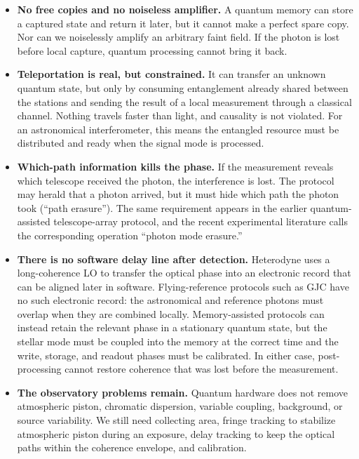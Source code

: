 \documentclass[]{spie}
\begin{document}
\begin{itemize}[leftmargin=*,itemsep=2pt]
    \item \textbf{No free copies and no noiseless amplifier.} A quantum memory can store a captured state and return it later, but it cannot make a perfect spare copy. Nor can we noiselessly amplify an arbitrary faint field. If the photon is lost before local capture, quantum processing cannot bring it back.

    \item \textbf{Teleportation is real, but constrained.} It can transfer an unknown quantum state, but only by consuming entanglement already shared between the stations and sending the result of a local measurement through a classical channel. Nothing travels faster than light, and causality is not violated. For an astronomical interferometer, this means the entangled resource must be distributed and ready when the signal mode is processed.

    \item \textbf{Which-path information kills the phase.} If the measurement reveals which telescope received the photon, the interference is lost. The protocol may herald that a photon arrived, but it must hide which path the photon took (``path erasure''). The same requirement appears in the earlier quantum-assisted telescope-array protocol, and the recent experimental literature calls the corresponding operation ``photon mode erasure.''\cite{Khabiboulline2019PRA,Stas2026}

    \item \textbf{There is no software delay line after detection.} Heterodyne uses a long-coherence LO to transfer the optical phase into an electronic record that can be aligned later in software. Flying-reference protocols such as GJC have no such electronic record: the astronomical and reference photons must overlap when they are combined locally. Memory-assisted protocols can instead retain the relevant phase in a stationary quantum state, but the stellar mode must be coupled into the memory at the correct time and the write, storage, and readout phases must be calibrated. In either case, post-processing cannot restore coherence that was lost before the measurement.

    \item \textbf{The observatory problems remain.} Quantum hardware does not remove atmospheric piston, chromatic dispersion, variable coupling, background, or source variability. We still need collecting area, fringe tracking to stabilize atmospheric piston during an exposure, delay tracking to keep the optical paths within the coherence envelope, and calibration.
\end{itemize}
\end{document}
